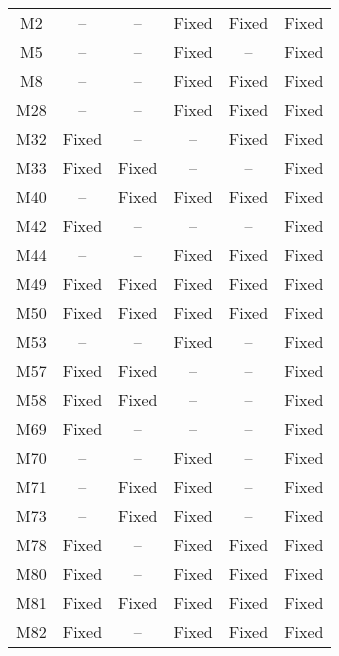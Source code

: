 \begin{table}[!t]
{\begin{tabular}{|c|c|c|c|c|c|}
\hline
M2                & --        & --        & Fixed     & Fixed     &Fixed   \\
M5                & --        & --        & Fixed     & --        &Fixed   \\
M8                & --        & --        & Fixed     & Fixed     &Fixed   \\
M28               & --        & --        & Fixed     & Fixed     &Fixed   \\
M32               & Fixed     & --        & --        & Fixed     &Fixed   \\
M33               & Fixed     & Fixed     & --        & --        &Fixed   \\
M40               & --        & Fixed     & Fixed     & Fixed     &Fixed   \\
M42               & Fixed     & --        & --        & --        &Fixed   \\
M44               & --        & --        & Fixed     & Fixed     &Fixed   \\
M49               & Fixed     & Fixed     & Fixed     & Fixed     &Fixed   \\
M50               & Fixed     & Fixed     & Fixed     & Fixed     &Fixed   \\
M53               & --        & --        & Fixed     & --        &Fixed   \\
M57               & Fixed     & Fixed     & --        & --        &Fixed   \\
M58               & Fixed     & Fixed     & --        & --        &Fixed   \\
M69               & Fixed     & --        & --        & --        &Fixed   \\
M70               & --        & --        & Fixed     & --        &Fixed   \\
M71               & --        & Fixed     & Fixed     & --        &Fixed   \\
M73               & --        & Fixed     & Fixed     & --        &Fixed   \\
M78               & Fixed     & --        & Fixed     & Fixed     &Fixed   \\
M80               & Fixed     & --        & Fixed     & Fixed     &Fixed   \\
M81               & Fixed     & Fixed     & Fixed     & Fixed     &Fixed   \\
M82               & Fixed     & --        & Fixed     & Fixed     &Fixed   \\

\end{tabular}}
\end{table}
